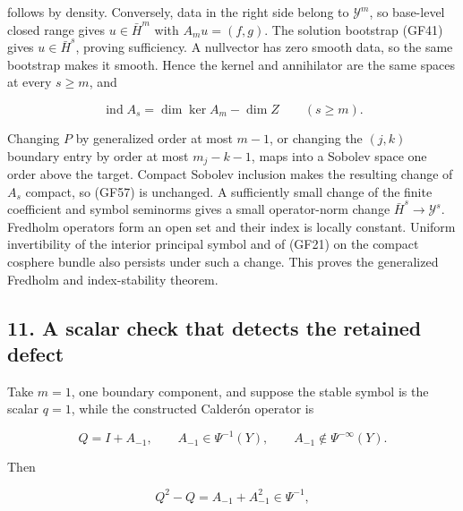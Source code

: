 \documentclass[
  11pt,
]{article}
\makeatletter
\let\ReaderOriginalAnchorStart\hyper@anchorstart
\let\ReaderOriginalAnchorEnd\hyper@anchorend
\let\ReaderPendingAliases\@empty
\def\ReaderArmAliases#1{\gdef\ReaderPendingAliases{#1}}
\def\hyper@anchorstart#1{\ReaderIfNativeAnchorTF{#1}{\ReaderPendingAliases\global\let\ReaderPendingAliases\@empty}{}\ReaderOriginalAnchorStart{#1}}
\makeatother
\begin{document}
follows by density. Conversely, data in the right side belong to
\(\mathcal Y^m\), so base-level closed range gives \(u\in\bar H^m\) with
\(A_mu=(f,g)\). The solution bootstrap (GF41) gives \(u\in\bar H^s\),
proving sufficiency. A nullvector has zero smooth data, so the same
bootstrap makes it smooth. Hence the kernel and annihilator are the same
spaces at every \(s\geq m\), and

\[
 \operatorname{ind}A_s=\dim\ker A_m-\dim Z
 \qquad(s\geq m).
 \tag{GF57}
\]

Changing \(P\) by generalized order at most \(m-1\), or changing the
\((j,k)\) boundary entry by order at most \(m_j-k-1\), maps into a
Sobolev space one order above the target. Compact Sobolev inclusion
makes the resulting change of \(A_s\) compact, so (GF57) is unchanged. A
sufficiently small change of the finite coefficient and symbol seminorms
gives a small operator-norm change \(\bar H^s\to\mathcal Y^s\). Fredholm
operators form an open set and their index is locally constant. Uniform
invertibility of the interior principal symbol and of (GF21) on the
compact cosphere bundle also persists under such a change. This proves
the generalized Fredholm and index-stability theorem.

\ReaderArmAliases{\ReaderOriginalAnchorStart{AN03-GCF-011}\ReaderOriginalAnchorEnd\begingroup\expandafter\def\csname @currentHref\endcsname{AN03-GCF-011}\label{AN03-GCF-011}\endgroup\ReaderOriginalAnchorStart{11-a-scalar-check-that-detects-the-retained-defect}\ReaderOriginalAnchorEnd\begingroup\expandafter\def\csname @currentHref\endcsname{11-a-scalar-check-that-detects-the-retained-defect}\label{11-a-scalar-check-that-detects-the-retained-defect}\endgroup\ReaderOriginalAnchorStart{a-scalar-check-that-detects-the-retained-defect}\ReaderOriginalAnchorEnd}
\subsection{11. A scalar check that detects the retained
defect}\label{a-scalar-check-that-detects-the-retained-defect}

Take \(m=1\), one boundary component, and suppose the stable symbol is
the scalar \(q=1\), while the constructed Calderón operator is

\[
 Q=I+A_{-1},
 \qquad A_{-1}\in\Psi^{-1}(Y),
 \qquad A_{-1}\notin\Psi^{-\infty}(Y).
 \tag{GF58}
\]

Then

\[
 Q^2-Q=A_{-1}+A_{-1}^2\in\Psi^{-1},
 \tag{GF59}
\]
\end{document}
